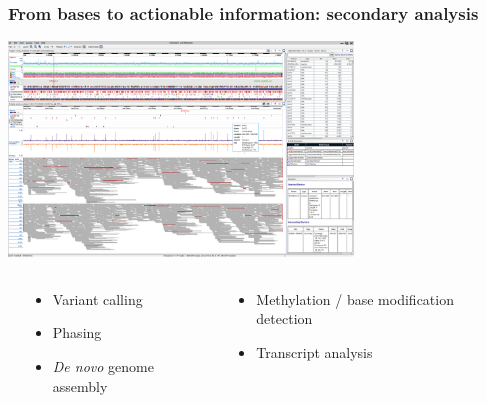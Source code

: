 \documentclass[serif,11pt]{beamer}
\begin{document}
\begin{frame}
\frametitle{From bases to actionable information: \textbf{secondary} analysis}
\label{sec-3-5}

   \vspace*{\bigskip}
   \hspace*{2em}
   \includegraphics[width=3.6in]{img/smrtview.png}
\begin{columns} %
\label{sec-3-5-1}
\begin{column}{0.5\textwidth}
\label{sec-3-5-1-1}

\begin{itemize}
\item Variant calling
\item Phasing
\item \emph{De novo} genome assembly
\end{itemize}
\end{column}
\begin{column}{0.5\textwidth}
\label{sec-3-5-1-2}

\begin{itemize}
\item Methylation / base modification detection
\item Transcript analysis
\end{itemize}
\end{column}
\end{columns}
\end{frame}
\end{document}
